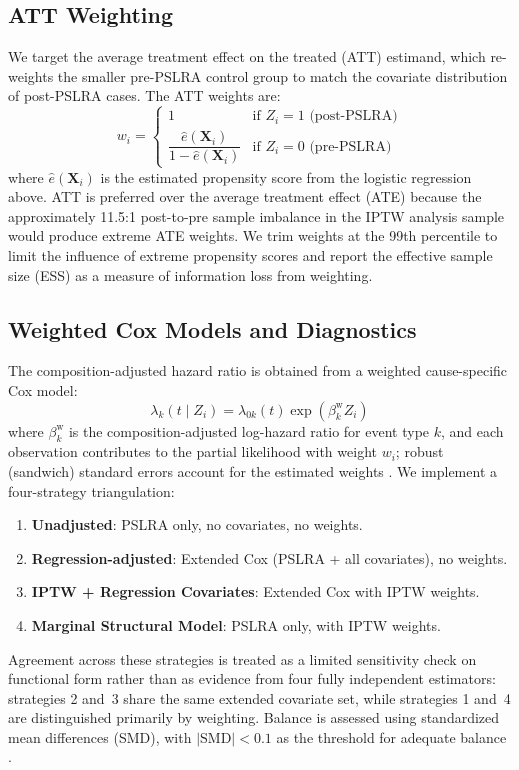 \subsection{ATT Weighting}

We target the average treatment effect on the treated (ATT)
estimand, which re-weights the smaller pre-PSLRA control group
to match the covariate distribution of post-PSLRA cases. The
ATT weights are:
\begin{equation}
w_i =
\begin{cases}
1 & \text{if } Z_i = 1 \text{ (post-PSLRA)} \\[4pt]
\dfrac{\hat{e}(\mathbf{X}_i)}{1 - \hat{e}(\mathbf{X}_i)} & \text{if } Z_i = 0 \text{ (pre-PSLRA)}
\end{cases}
\end{equation}
where $\hat{e}(\mathbf{X}_i)$ is the estimated propensity score from the logistic regression above.
ATT is preferred over the average treatment effect (ATE)
because the approximately 11.5:1 post-to-pre sample imbalance
in the IPTW analysis sample would produce
extreme ATE weights. We trim weights at the 99th percentile
to limit the influence of extreme propensity scores and report
the effective sample size (ESS) as a measure of information
loss from weighting.

\subsection{Weighted Cox Models and Diagnostics}

The composition-adjusted hazard ratio is obtained from a
weighted cause-specific Cox model:
\begin{equation}
\lambda_k(t \mid Z_i) = \lambda_{0k}(t) \exp(\beta_k^{\text{w}} Z_i)
\end{equation}
where $\beta_k^{\text{w}}$ is the composition-adjusted log-hazard ratio for event type $k$, and each observation contributes to the partial likelihood
with weight $w_i$; robust (sandwich) standard errors account
for the estimated weights \citep{xieliu2005}. We implement a
four-strategy triangulation:
\begin{enumerate}
    \item \textbf{Unadjusted}: PSLRA only, no covariates, no weights.
    \item \textbf{Regression-adjusted}: Extended Cox (PSLRA + all
    covariates), no weights.
    \item \textbf{IPTW + Regression Covariates}: Extended Cox with IPTW weights.
    \item \textbf{Marginal Structural Model}: PSLRA only, with IPTW weights.
\end{enumerate}
Agreement across these strategies is treated as a limited
sensitivity check on functional form rather than as evidence
from four fully independent estimators: strategies 2 and~3
share the same extended covariate set, while strategies 1
and~4 are distinguished primarily by weighting. Balance is assessed using standardized mean differences
(SMD), with $|\text{SMD}| < 0.1$
as the threshold for adequate balance \citep{austinfine2025}.

